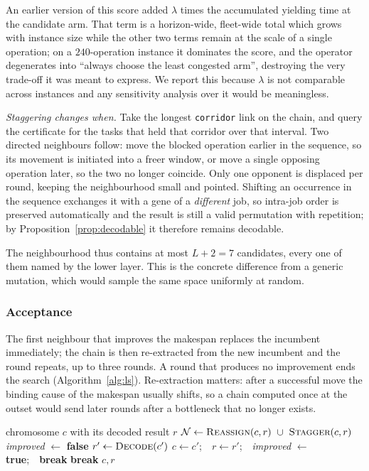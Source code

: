 \documentclass[manuscript,screen,review]{acmart}
\begin{document}
An earlier version of this score added $\lambda$ times the accumulated yielding
time at the candidate arm. That term is a horizon-wide, fleet-wide total which
grows with instance size while the other two terms remain at the scale of a
single operation; on a $240$-operation instance it dominates the score, and the
operator degenerates into ``always choose the least congested arm'', destroying
the very trade-off it was meant to express. We report this because $\lambda$ is
not comparable across instances and any sensitivity analysis over it would be
meaningless.

\emph{Staggering changes when.} Take the longest \texttt{corridor} link on the
chain, and query the certificate for the tasks that held that corridor over
that interval. Two directed neighbours follow: move the blocked operation
earlier in the sequence, so its movement is initiated into a freer window, or
move a single opposing operation later, so the two no longer coincide. Only one
opponent is displaced per round, keeping the neighbourhood small and pointed.
Shifting an occurrence in the sequence exchanges it with a gene of a
\emph{different} job, so intra-job order is preserved automatically and the
result is still a valid permutation with repetition; by
Proposition~\ref{prop:decodable} it therefore remains decodable.

The neighbourhood thus contains at most $L+2=7$ candidates, every one of them
named by the lower layer. This is the concrete difference from a generic
mutation, which would sample the same space uniformly at random.

\subsubsection{Acceptance}
The first neighbour that improves the makespan replaces the incumbent
immediately; the chain is then re-extracted from the new incumbent and the
round repeats, up to three rounds. A round that produces no improvement ends
the search (Algorithm~\ref{alg:ls}). Re-extraction matters: after a successful
move the binding cause of the makespan usually shifts, so a chain computed once
at the outset would send later rounds after a bottleneck that no longer exists.

\begin{algorithm}[t]
\caption{\textsc{ContentionGuidedSearch}}
\label{alg:ls}
\small
\begin{algorithmic}[1]
\Require chromosome $c$ with its decoded result $r$
  \State $\mathcal{N}\gets\textsc{Reassign}(c,r)\ \cup\ \textsc{Stagger}(c,r)$
  \State \textit{improved} $\gets$ \textbf{false}
    \State $r'\gets\textsc{Decode}(c')$
      \State $c\gets c'$;\ \ $r\gets r'$;\ \ \textit{improved} $\gets$
             \textbf{true};\ \ \textbf{break}
    \EndIf
  \EndFor
   \State \textbf{break} \EndIf
\EndFor
\State \Return $c,r$
\end{algorithmic}
\end{algorithm}
\end{document}

